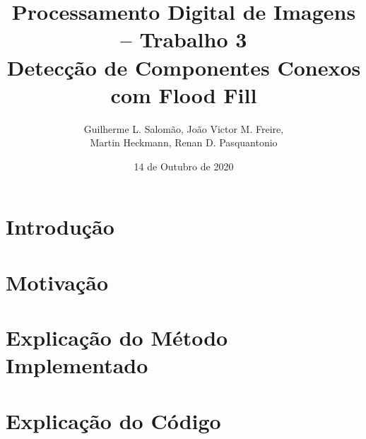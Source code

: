 \documentclass[12pt,a4paper]{article}
\title{Processamento Digital de Imagens – Trabalho 3\\Detecção de Componentes Conexos com Flood Fill}
\author{Guilherme L. Salomão, João Victor M. Freire, \\Martin Heckmann, Renan D. Pasquantonio }
\date{14 de Outubro de 2020}
\begin{document}
\maketitle

\section{Introdução}

\section{Motivação}

\section{Explicação do Método Implementado}

\section{Explicação do Código}


\nocite{comin2020}
\nocite{wiki01}



\end{document}
